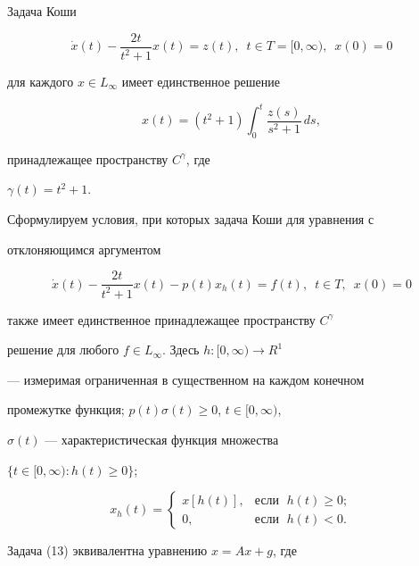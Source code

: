 \begin{exam}


Задача Коши


$$


\Dot{x}(t)- \frac{2t}{t^2+1} x(t) = z(t),\ \; t\in T=[0,\infty),\ \; x(0)=0


$$


для каждого $x\in L_\infty$ имеет единственное решение


$$


x(t) = (t^2+1)\int_0^t\frac{z(s)}{s^2+1}\,ds,


$$


принадлежащее пространству $C^\gamma$, где


$\gamma(t)=t^2+1$.


Сформулируем условия, при которых задача Коши для уравнения с


отклоняющимся аргументом


\begin{equation}


\Dot{x}(t)- \frac{2t}{t^2+1} x(t) - p(t) x_h(t) = f(t),\ \;


t\in T,\ \; x(0)=0


\end{equation}


также имеет единственное принадлежащее пространству $C^\gamma$


решение для любого $f\in L_\infty$. Здесь $h:[0,\infty)\to R^1$


--- измеримая ограниченная в существенном на каждом конечном


промежутке функция; $p(t)\sigma(t)\geq 0$, $t\in[0,\infty)$,


$\sigma(t)$ --- характеристическая функция множества


$\{t\in[0,\infty):h(t)\geq 0\}$;


$$


x_h(t) =


\begin{cases}


x[h(t)],&\text{если }\; h(t)\geq 0;\\


0,&\text{если }\; h(t)<0.


\end{cases}


$$





Задача (13) эквивалентна уравнению $x=Ax+g$, где


$$



\end{exam}

